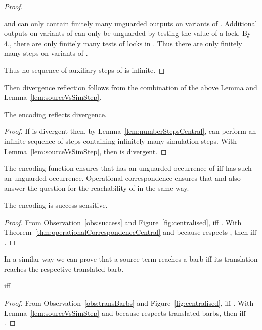 \documentclass[]{eptcs}
\begin{document}
\begin{proof}
\begin{compactenum}
		\item  and  can only contain finitely many unguarded outputs on variants of . Additional outputs on variants of  can only be unguarded by testing the value of a lock. By 4., there are only finitely many tests of locks in . Thus there are only finitely many steps on variants of .
	\end{compactenum}
	Thus no sequence of auxiliary steps of  is infinite.
\end{proof}

Then divergence reflection follows from the combination of the above Lemma and Lemma~\ref{lem:sourceVsSimStep}.

\begin{theorem}
	The encoding  reflects divergence.
	\label{thm:divergenceReflectionCentral}
\end{theorem}

\begin{proof}
	If  is divergent then, by Lemma~\ref{lem:numberStepsCentral},  can perform an infinite sequence of steps containing infinitely many simulation steps. With Lemma~\ref{lem:sourceVsSimStep}, then  is divergent.
\end{proof}

The encoding function ensures that  has an unguarded occurrence of  iff  has such an unguarded occurrence. Operational correspondence ensures that  and  also answer the question for the reachability of  in the same way.

\begin{theorem}
	The encoding  is success sensitive.
	\label{thm:successSensitivenessCentral}
\end{theorem}

\begin{proof}
	From Observation~\ref{obs:success} and Figure~\ref{fig:centralised},  iff . With Theorem~\ref{thm:operationalCorrespondenceCentral} and because  respects , then  iff .
\end{proof}

In a similar way we can prove that a source term reaches a barb iff its translation reaches the respective translated barb.

\begin{theorem}
	 iff 
	\label{thm:respectsBarbsCentral}
\end{theorem}

\begin{proof}
	From Observation~\ref{obs:transBarbs} and Figure~\ref{fig:centralised},  iff . With Lemma~\ref{lem:sourceVsSimStep} and because  respects translated barbs, then  iff .
\end{proof}
\end{document}

